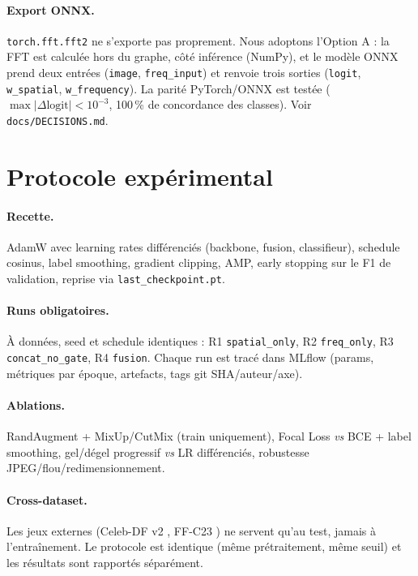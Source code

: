 \documentclass[11pt,a4paper]{article}
\begin{document}
\paragraph{Export ONNX.} \texttt{torch.fft.fft2} ne s'exporte pas proprement.
Nous adoptons l'Option A : la FFT est calculée hors du graphe, côté inférence
(NumPy), et le modèle ONNX prend deux entrées (\texttt{image}, \texttt{freq\_input})
et renvoie trois sorties (\texttt{logit}, \texttt{w\_spatial},
\texttt{w\_frequency}). La parité PyTorch/ONNX est testée
($\max|\Delta \text{logit}| < 10^{-3}$, 100\,\% de concordance des classes).
Voir \texttt{docs/DECISIONS.md}.

\section{Protocole expérimental}
\paragraph{Recette.} AdamW avec learning rates différenciés (backbone, fusion,
classifieur), schedule cosinus, label smoothing, gradient clipping, AMP,
early stopping sur le F1 de validation, reprise via \texttt{last\_checkpoint.pt}.

\paragraph{Runs obligatoires.} À données, seed et schedule identiques :
R1 \texttt{spatial\_only}, R2 \texttt{freq\_only}, R3 \texttt{concat\_no\_gate},
R4 \texttt{fusion}. Chaque run est tracé dans MLflow (params, métriques par
époque, artefacts, tags git SHA/auteur/axe).

\paragraph{Ablations.} RandAugment \cite{cubuk2020randaugment} + MixUp/CutMix
\cite{zhang2018mixup,yun2019cutmix} (train uniquement), Focal Loss
\cite{lin2017focal} \textit{vs} BCE + label smoothing, gel/dégel progressif
\textit{vs} LR différenciés, robustesse JPEG/flou/redimensionnement.

\paragraph{Cross-dataset.} Les jeux externes (Celeb-DF v2 \cite{li2020celebdf},
FF-C23 \cite{rossler2019faceforensics}) ne servent qu'au test, jamais à
l'entraînement. Le protocole est identique (même prétraitement, même seuil) et
les résultats sont rapportés séparément.
\end{document}
